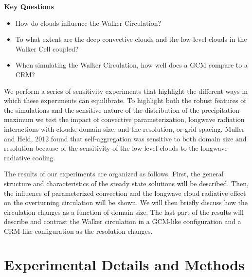 \documentclass[11pt]{article}   	%
\begin{document}
\textbf{Key Questions}
\begin{itemize}
  \item{How do clouds influence the Walker Circulation?}
  \item{To what extent are the deep convective clouds and the low-level clouds in the Walker Cell coupled?}
  \item{When simulating the Walker Circulation, how well does a GCM compare to a CRM?}  
\end{itemize}

We perform a series of sensitivity experiments that highlight the different ways in which these experiments can equilibrate.  To 
highlight both the robust features of the simulations and the sensitive nature of the distribution of the precipitation maximum 
we test the impact of convective parameterization, 
longwave radiation interactions with clouds, domain size, 
and the resolution, or grid-spacing.    Muller and Held, 2012 found that self-aggregation was sensitive to both domain size and resolution
because of the sensitivity of the low-level clouds to the longwave radiative cooling.  

The results of our experiments are organized as follows.  First, the general structure and characteristics of the steady state solutions
will be described.   Then, the influence of parameterized convection and the longwave cloud radiative effect on the overturning 
circulation will be shown.  We will then briefly discuss how the circulation changes as a function of domain size.  The last part of the
results will describe and contrast the Walker circulation in a GCM-like configuration and a CRM-like configuration as the 
resolution changes.

\section{Experimental Details and Methods}
\end{document}
